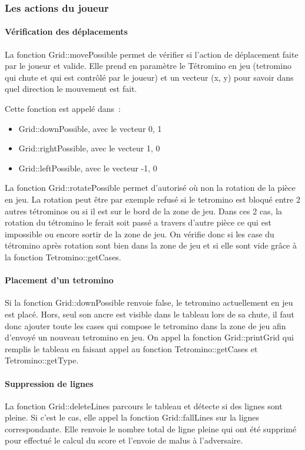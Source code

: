 \documentclass[a4paper, 12pt]{article}
\begin{document}
		\subsubsection{Les actions du joueur}

			\paragraph{Vérification des déplacements}
			La fonction Grid::movePossible permet de vérifier si l’action de déplacement faite par le joueur et valide. Elle prend en paramètre le Tétromino en jeu (tetromino qui chute et qui est contrôlé par le joueur) et un vecteur (x, y) pour savoir dans quel direction le mouvement est fait.

			Cette fonction est appelé dans : 
			\begin{itemize}
				\item Grid::downPossible, avec le vecteur {0, 1}
				\item Grid::rightPossible, avec le vecteur {1, 0}
				\item Grid::leftPossible, avec le vecteur {-1, 0}
			\end{itemize}

			La fonction Grid::rotatePossible permet d’autorisé où non la rotation de la pièce en jeu. La rotation peut être par exemple refusé si le tetromino est bloqué entre 2 autres tétrominos ou si il est sur le bord de la zone de jeu. Dans ces 2 cas, la rotation du tétromino le ferait soit passé a travers d’autre pièce ce qui est impossible ou encore sortir de la zone de jeu. On vérifie donc si les case du tétromino après rotation sont bien dans la zone de jeu et si elle sont vide grâce à la fonction Tetromino::getCases.

			\paragraph{Placement d’un tetromino}
			Si la fonction Grid::downPossible renvoie false, le tetromino actuellement en jeu est placé. Hors, seul son ancre est visible dans le tableau lors de sa chute, il faut donc ajouter toute les cases qui compose le tetromino dans la zone de jeu afin d’envoyé un nouveau tetromino en jeu.
			On appel la fonction Grid::printGrid qui remplis le tableau en faisant appel au fonction Tetromino::getCases et Tetromino::getType.

			\paragraph{Suppression de lignes}
			La fonction Grid::deleteLines parcours le tableau et détecte si des lignes sont pleine.
			Si c’est le cas, elle appel la fonction Grid::fallLines sur la lignes correspondante.
			Elle renvoie le nombre total de ligne pleine qui ont été supprimé pour effectué le calcul du score et l’envoie de malus à l’adversaire.
\end{document}
